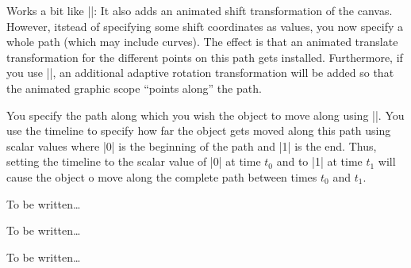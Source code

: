 \begin{command}{\pgfsys@animatemotion}
  Works a bit like |\pgfsys@animation@translate|: It also adds an
  animated shift transformation of the canvas. However, itstead of
  specifying some shift coordinates as values, you now specify a whole
  path (which may include curves). The effect is that an animated
  translate transformation for the different points on this path gets
  installed. Furthermore, if you use |\pgfsys@animation@rotatealong|, an
  additional adaptive rotation transformation will be added so that
  the animated graphic scope ``points along'' the path.

  You specify the path along which you wish the object to move along
  using |\pgfsys@animation@movealong|. You use the timeline to specify
  how far the object gets moved along this path using scalar values
  where |0| is the beginning of the path and |1| is the end. Thus,
  setting the timeline to the scalar value of |0| at time $t_0$ and to
  |1| at time $t_1$ will cause the object o move along the complete
  path between times $t_0$ and $t_1$.
\begin{codeexample}[width=2cm]
\end{codeexample}
\begin{codeexample}[width=2cm]
\end{codeexample}


  \begin{command}{\pgfsys@animation@rotatealong}
    To be written\dots
  \end{command}
  
  \begin{command}{\pgfsys@animation@norotatealong}
    To be written\dots
  \end{command}
  
  \begin{command}{\pgfsys@animation@movealong{}}
    To be written\dots
  \end{command}

\end{command}


